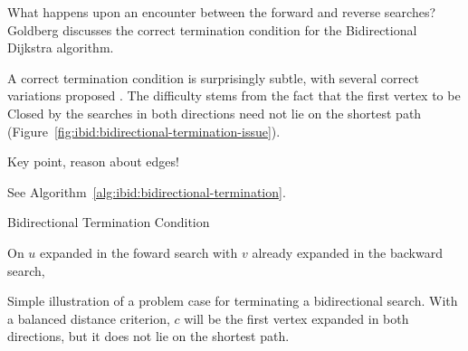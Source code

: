 What happens upon an encounter between the forward and reverse searches?
Goldberg \citep{goldberg2005spexternalmemory}
discusses the correct termination condition for the 
Bidirectional Dijkstra algorithm.

A correct termination condition is surprisingly subtle,%
with several correct variations proposed
\citep{nicholson1966shortest, dreyfus1969appraisalsp,
pohl1969bidirectional, goldberg2005spexternalmemory}.
The difficulty stems from the fact that the first vertex to be
{\sc Closed} by the searches in both directions
need not lie on the shortest path
(Figure~\ref{fig:ibid:bidirectional-termination-issue}).

Key point, reason about edges!

See Algorithm~\ref{alg:ibid:bidirectional-termination}.

\begin{algorithm}[t]
   \caption{Bidirectional Termination Condition}
   \label{alg:ibid:bidirectional-termination}
   \begin{algorithmic}[1]
      \State On $u$ expanded in the foward search
         with $v$ already expanded in the backward search,
   \end{algorithmic}
\end{algorithm}

\begin{marginfigure}
   \centering
   \caption{Simple illustration of a problem case for terminating
      a bidirectional search.
      With a balanced distance criterion,
      $c$ will be the first vertex expanded in both directions,
      but it does not lie on the shortest path.}
   \label{fig:ibid:bidirectional-termination-issue}
\end{marginfigure}

